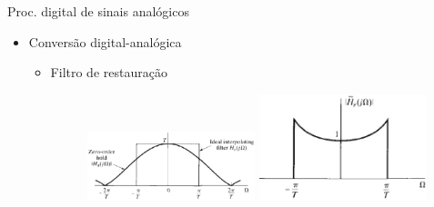\begin{slide}{Proc. digital de sinais anal\'ogicos}
\begin{itemize}
   \item Conversão digital-analógica
   \begin{itemize}
      \item Filtro de restauração 
      \begin{figure}
        \centering
         \includegraphics[width = 0.49\textwidth]{figs/da_conv1.eps}
        \includegraphics[width = 0.49\textwidth]{figs/da_conv2.eps}
      \end{figure}

   \end{itemize}
\end{itemize}
\end{slide}

